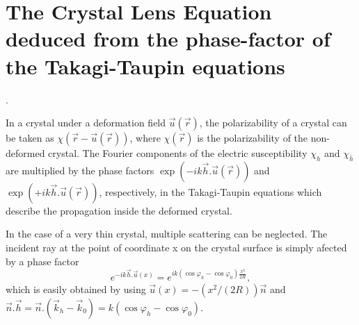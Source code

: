 \documentclass[preprint]{iucr}              %
\begin{document}




\appendix
\section{The Crystal Lens Equation deduced from the phase-factor of the Takagi-Taupin equations}
\label{appendix:CLE}.

In a crystal under a deformation field $\vec u(\vec r)$, the polarizability of a crystal can be taken as $\chi(\vec r-\vec u(\vec r))$, where $\chi(\vec r)$ is the polarizability of the non-deformed crystal. The Fourier components of the electric susceptibility $\chi_h$ and $\chi_{\bar h}$ are multiplied by the phase factors $\exp(-i k \vec h . \vec u (\vec r))$ and $\exp(+i k \vec h . \vec u (\vec r))$, respectively, in the Takagi-Taupin equations which describe  the propagation inside the deformed crystal.

In the case of a very thin crystal, multiple scattering can be neglected. The incident ray at the point of coordinate x on the crystal surface is simply afected by a phase factor 
\begin{equation}
    e^{-i k \vec h . \vec u(x)} = e^{i k (\cos\varphi_h-\cos\varphi_0) \frac{x^2}{2 R} },
\end{equation}
which is easily obtained by using $\vec u(x) = -(x^2/(2R))\vec n$ and $\vec n . \vec h = \vec n.(\vec k_h - \vec k_0) = k(\cos\varphi_h-\cos\varphi_0)$. 
\end{document}
